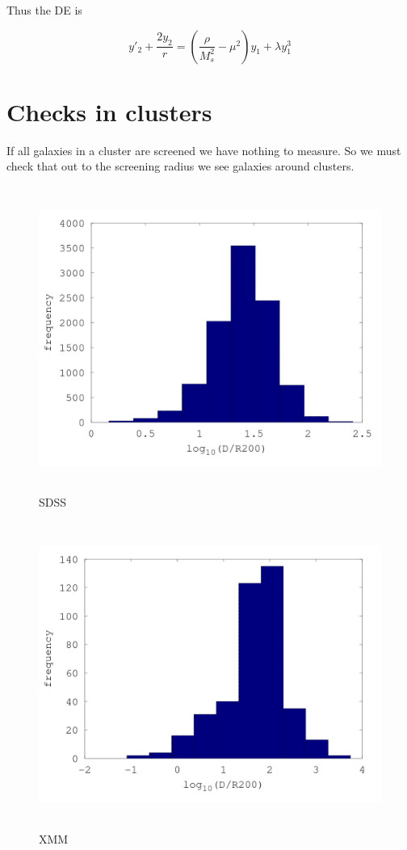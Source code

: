\documentclass[aps,showpacs,onecolumn,floats,prd,superscriptaddress,nofootinbib]{revtex4-1}
\begin{document}
Thus the DE is 

\begin{equation}
	y'_2 + \frac{2y_2}{r} = \left( \frac{\rho}{M_s^2} - \mu^2 \right) y_1 + \lambda y_1^3
\end{equation}

\section{Checks in clusters}

If all galaxies in a cluster are screened we have nothing to measure. 
So we must check that out to the screening radius we see galaxies around clusters. 

\begin{figure}[h!]
\begin{center}
\includegraphics[width=\textwidth,height=10cm]{Cluster_Distances_sdss.pdf}
\caption{SDSS}
\label{osc}
\end{center}
\end{figure}

\begin{figure}[h!]
\begin{center}
\includegraphics[width=\textwidth,height=10cm]{Cluster_Distances_xmm.pdf}
\caption{XMM}
\label{osc}
\end{center}
\end{figure}




\end{document}
